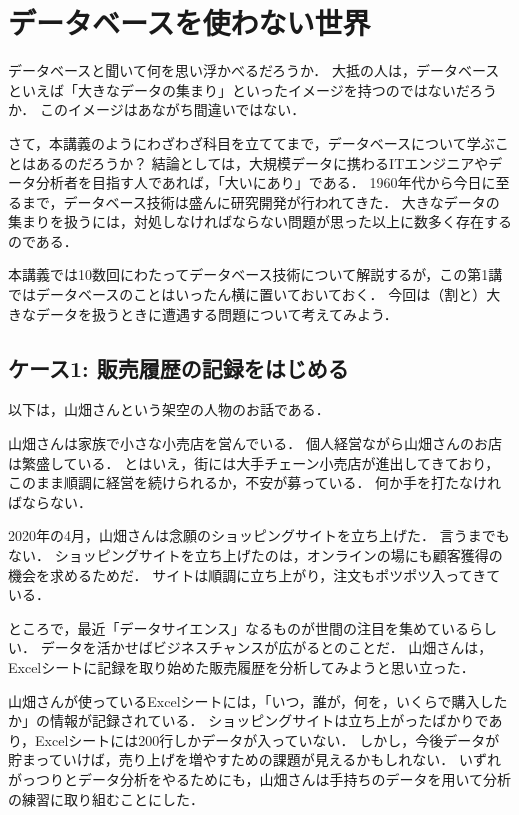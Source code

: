 \chapter{データベースを使わない世界}

データベースと聞いて何を思い浮かべるだろうか．
大抵の人は，データベースといえば「大きなデータの集まり」といったイメージを持つのではないだろうか．
このイメージはあながち間違いではない．

さて，本講義のようにわざわざ科目を立ててまで，データベースについて学ぶことはあるのだろうか？
結論としては，大規模データに携わるITエンジニアやデータ分析者を目指す人であれば，「大いにあり」である．
1960年代から今日に至るまで，データベース技術は盛んに研究開発が行われてきた．
大きなデータの集まりを扱うには，対処しなければならない問題が思った以上に数多く存在するのである．

本講義では10数回にわたってデータベース技術について解説するが，この第1講ではデータベースのことはいったん横に置いておいておく．
今回は（割と）大きなデータを扱うときに遭遇する問題について考えてみよう．


\section{ケース1: 販売履歴の記録をはじめる}
以下は，山畑さんという架空の人物のお話である．

\begin{framed}
山畑さんは家族で小さな小売店を営んでいる．
個人経営ながら山畑さんのお店は繁盛している．
とはいえ，街には大手チェーン小売店が進出してきており，このまま順調に経営を続けられるか，不安が募っている．
何か手を打たなければならない．

2020年の4月，山畑さんは念願のショッピングサイトを立ち上げた．
言うまでもない．
ショッピングサイトを立ち上げたのは，オンラインの場にも顧客獲得の機会を求めるためだ．
サイトは順調に立ち上がり，注文もポツポツ入ってきている．

ところで，最近「データサイエンス」なるものが世間の注目を集めているらしい．
データを活かせばビジネスチャンスが広がるとのことだ．
山畑さんは，Excelシートに記録を取り始めた販売履歴を分析してみようと思い立った．

山畑さんが使っているExcelシートには，「いつ，誰が，何を，いくらで購入したか」の情報が記録されている．
ショッピングサイトは立ち上がったばかりであり，Excelシートには200行しかデータが入っていない．
しかし，今後データが貯まっていけば，売り上げを増やすための課題が見えるかもしれない．
いずれがっつりとデータ分析をやるためにも，山畑さんは手持ちのデータを用いて分析の練習に取り組むことにした．
\end{framed}


